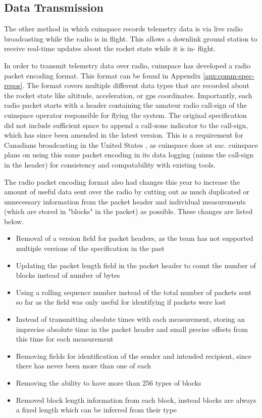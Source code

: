 \subsection{Data Transmission}

The other method in which \gls{cuinspace} records telemetry data is via live radio broadcasting while the radio is in
flight. This allows a downlink ground station to receive real-time updates about the rocket state while it is in-
flight.

In order to transmit telemetry data over radio, \gls{cuinspace} has developed a radio packet encoding format. This
format can be found in Appendix \ref{apx:comm-spec-repos}. The format covers multiple different data types that are
recorded about the rocket state like altitude, acceleration, or \gls{gps} coordinates. \cite{radio-comms}
Importantly, each radio packet starts with a header containing the amateur radio call-sign of the \gls{cuinspace}
operator responsible for flying the system. \cite{radio-comms} The original specification did not include sufficient
space to append a call-zone indicator to the call-sign, which has since been amended in the latest version. This is a
requirement for Canadians broadcasting in the United States \cite{foreign-broadcast}, as \gls{cuinspace} does at
\gls{sac}. \gls{cuinspace} plans on using this same packet encoding in its data logging (minus the call-sign in the header)
for consistency and compatability with existing tools.

The radio packet encoding format also had changes this year to increase the amount of useful data sent over the radio by
cutting out as much duplicated or unnecessary information from the packet header and individual measurements (which are
stored in "blocks" in the packet) as possible. These changes are listed below.

\begin{itemize}
    \item Removal of a version field for packet headers, as the team has not supported multiple versions of the
          specification in the past
    \item Updating the packet length field in the packet header to count the number of blocks instead of number of bytes
    \item Using a rolling sequence number instead of the total number of packets sent so far as the field was only
          useful for identifying if packets were lost
    \item Instead of transmitting absolute times with each measurement, storing an imprecise absolute time in the packet
          header and small precise offsets from this time for each measurement
    \item Removing fields for identification of the sender and intended recipient, since there has never been more than
          one of each
    \item Removing the ability to have more than 256 types of blocks
    \item Removed block length information from each block, instead blocks are always a fixed length which can be inferred
          from their type
\end{itemize}

